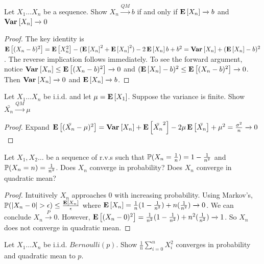 \documentclass[10pt]{article}
\begin{document}
\begin{exercise}
    Let $X_1 \dots X_n$ be a sequence. Show $X_n \xrightarrow{QM} b$ if and
    only if $\E{X_n} \xrightarrow{} b$ and $\Var{X_n} \xrightarrow{} 0$
\end{exercise}

\begin{proof}
    The key identity is $\E{(X_n - b)^2} = \E{X_n^2} - (\E{X_n}^2 + \E{X_n}^2)
    -2\E{X_n}b + b^2 = \Var{X_n} + (\E{X_n}-b)^2$. The reverse implication
    follows immediately. To see the forward argument, notice $\Var{X_n} \leq
    \E{(X_n - b)^2} \xrightarrow{} 0$
    and $(\E{X_n}-b)^2 \leq \E{(X_n - b)^2} \xrightarrow{} 0$. Then $\Var{X_n}
    \xrightarrow{} 0$ and $\E{X_n} \xrightarrow{} b$.
\end{proof}

\begin{exercise}
    Let $X_1 \dots X_n$ be i.i.d. and let $\mu = \E{X_1}$. Suppose the variance
    is finite. Show $\bar{X_n} \xrightarrow{QM} \mu$
\end{exercise}

\begin{proof}
    Expand $\E{(\bar{X_n}-\mu)^2} = \Var{X_n} + \E{\bar{X_n}^2}
    -2\mu\E{\bar{X_n}} + \mu^2 = \frac{\sigma^2}{n} \xrightarrow{} 0$
\end{proof}

\begin{exercise}
    Let $X_1, X_2 \dots$ be a sequence of r.v.s such that $\P(X_n =
    \frac{1}{n}) = 1 - \frac{1}{n^2}$ and $\P(X_n = n) = \frac{1}{n^2}$. Does
    $X_n$ converge in probability? Does $X_n$ converge in quadratic mean?
\end{exercise}

\begin{proof}
    Intuitively $X_n$ approaches 0 with increasing probability. Using Markov's, $\P(|X_n - 0| >
    \epsilon) \leq \frac{\E{X_n}}{\epsilon}$ where $\E{X_n} = \frac{1}{n}(1 - \frac{1}{n^2}) + n(\frac{1}{n^2}) \xrightarrow{} 0$. We can conclude $X_n
    \xrightarrow{P} 0$.
    However, $\E{(X_n-0)^2} = \frac{1}{n^2}(1 - \frac{1}{n^2}) +
    n^2(\frac{1}{n^2}) \xrightarrow{} 1$. So $X_n$ does not converge in
    quadratic mean.
\end{proof}

\begin{exercise}
    Let $X_1 \dots X_n$ be i.i.d. $Bernoulli(p)$. Show
    $\frac{1}{n}\sum_{i=0}^nX_i^2$ converges in probability and quadratic mean
    to $p$.
\end{exercise}
\end{document}
